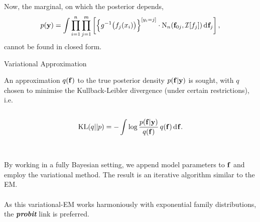 \documentclass{beamer}
\newlength{\onecolwid}
\newlength{\twocolwid}
\begin{document}
\begin{frame}[t]
\begin{columns}[t]
\begin{column}{\twocolwid}
\begin{columns}[t,totalwidth=\twocolwid]
\begin{column}{\onecolwid}
\vspace{-2cm}
\begin{block}{}

Now, the marginal, on which the posterior depends,
\[
  p({\mathbf y}) = \int \prod_{i=1}^n \prod_{j=1}^m \left[ \Big\{ g^{-1}\big( f_j(x_i) \big) \Big\}^{[y_i = j]} \cdot \operatorname{N}_n({\mathbf f}_{0j},{\mathcal I}[f_j]) \operatorname{d\!\:\!} {\mathbf f}_j \right],
\]
cannot be found in closed form.

\end{block}

\begin{block}{Variational Approximation}

An approximation $q({\mathbf f})$ to the true posterior density $p({\mathbf f}|{\mathbf y})$ is sought, with $q$ chosen to minimise the Kullback-Leibler divergence (under certain restrictions), i.e.
\\~\\[-2.5ex]
\[
  \operatorname{KL}(q||p) = -\int \log \frac{p({\mathbf f}|{\mathbf y})}{q({\mathbf f})} \, q({\mathbf f}) \operatorname{d\!\:\!} {\mathbf f}.
\]
\\~\\[-0.3ex]
By working in a fully Bayesian setting, we append model parameters to ${\mathbf f}$ and employ the variational method. The result is an iterative algorithm similar to the EM.
\\~\\[-0.8ex]
As this variational-EM works harmoniously with exponential family distributions, the {\bf\emph{probit}} link is preferred.
  
\end{block}


\end{column}
\end{columns}
\end{column}
\end{columns}
\end{frame}
\end{document}
